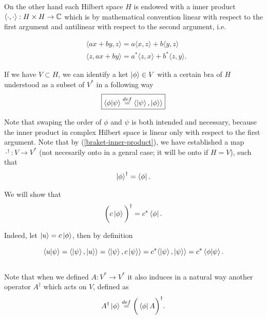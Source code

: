 \documentclass[main.tex]{subfiles}
\begin{document}
On the other hand each Hilbert space $H$ is endowed with a inner product $\langle\cdot,\cdot \rangle:H\times H\to \mathbb{C}$ which is by mathematical convention linear with respect to the first argument and antilinear with respect to the second argument, i.e. 

\begin{align}
& \langle ax + by, z \rangle = a\langle x, z \rangle + b \langle y, z \rangle \\
& \langle z, ax + by \rangle = a^*\langle z, x \rangle + b^* \langle z, y \rangle.
\end{align}

If we have $V\subset H$, we can identify a ket $\ket{\phi}\in V$ with a certain bra of $H$ understood as a subset of $V^*$ in a following way
\begin{equation}
\label{braket-inner-product}
\boxed{
\bra{\phi}\ket{\psi} \stackrel{def}{=} \langle \ket{\psi}, \ket{\phi} \rangle}
\end{equation}

Note that swaping the order of $\phi$ and $\psi$ is both intended and necessary, because the inner product in complex Hilbert space is linear only with respect to the first argument. Note that by (\ref{braket-inner-product}), we have established a map $\cdot^\dagger:V\to V^*$ (not necesarily onto in a genral case; it will be onto if $H=V$), such that
\begin{equation}
\ket{\phi}^\dagger = \bra{\phi}.
\end{equation}

We will show that
\begin{equation}
\bigg(c\ket{\phi}\bigg)^\dagger = c^*\bra{\phi}.
\end{equation}

Indeed, let $\ket{u} = c\ket{\phi}$, then by definition 

\begin{equation}
\bra{u}\ket{\psi} =  \langle \ket{\psi}, \ket{u} \rangle = \langle \ket{\psi}, c\ket{\psi} \rangle = c^*  \langle \ket{\psi}, \ket{\psi} \rangle = c^*\bra{\phi}\ket{\psi}.
\end{equation}\\

Note that when we defined $A:V^*\to V^*$ it also induces in a natural way another operator $A^\dagger$ which acts on $V$, defined as
\begin{equation}
A^\dagger \ket{\phi} \stackrel{def}{=} \bigg(\bra{\phi}A\bigg)^\dagger.
\end{equation}
\end{document}
